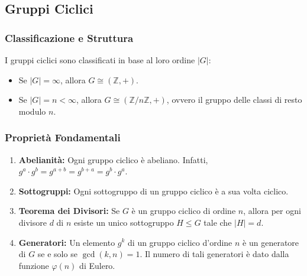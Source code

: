 \subsection{Gruppi Ciclici}

\subsubsection*{Classificazione e Struttura}
I gruppi ciclici sono classificati in base al loro ordine $|G|$:
\begin{itemize}
    \item Se $|G| = \infty$, allora $G \cong (\mathbb{Z}, +)$.
    \item Se $|G| = n < \infty$, allora $G \cong (\mathbb{Z}/n\mathbb{Z}, +)$, ovvero il gruppo delle classi di resto modulo $n$.
\end{itemize}

\subsubsection*{Proprietà Fondamentali}
\begin{enumerate}
    \item \textbf{Abelianità:} Ogni gruppo ciclico è abeliano. Infatti, $g^a \cdot g^b = g^{a+b} = g^{b+a} = g^b \cdot g^a$.
    \item \textbf{Sottogruppi:} Ogni sottogruppo di un gruppo ciclico è a sua volta ciclico.
    \item \textbf{Teorema dei Divisori:} Se $G$ è un gruppo ciclico di ordine $n$, allora per ogni divisore $d$ di $n$ esiste un unico sottogruppo $H \le G$ tale che $|H| = d$.
    \item \textbf{Generatori:} Un elemento $g^k$ di un gruppo ciclico d'ordine $n$ è un generatore di $G$ se e solo se $\gcd(k, n) = 1$. Il numero di tali generatori è dato dalla funzione $\varphi(n)$ di Eulero.
\end{enumerate}

